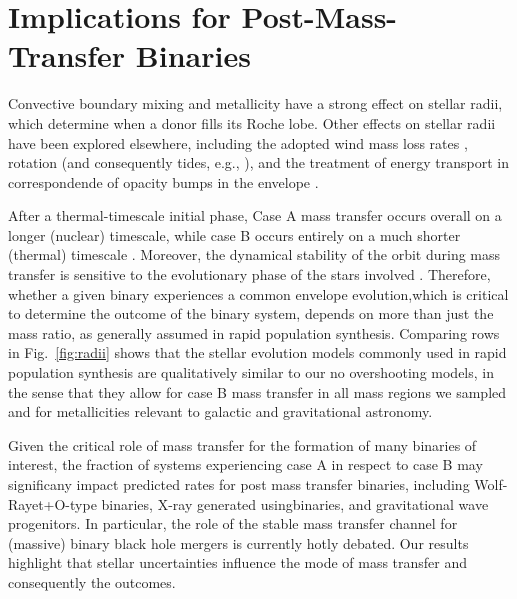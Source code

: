 \documentclass[twocolumn]{aastex631}
\DeclareRobustCommand{\Figref}[1]{Fig.~\ref{#1}}
\begin{document}
\section{Implications for Post-Mass-Transfer Binaries}

Convective boundary mixing \citep{brott:11, johnston:24} and
metallicity have a strong effect on stellar radii, which determine
when a donor fills its Roche lobe. Other effects on stellar radii have
been explored elsewhere, including the adopted wind mass loss rates
\citep[e.g.,][]{smith:14, renzo:17, josiek:24}, rotation (and
consequently tides, e.g., \citealt{maeder:00}), and the treatment of energy transport
in correspondende of opacity bumps in the envelope
\citep[e.g.,][]{joss:73, agrawal:22, cheng:24}.

After a thermal-timescale initial phase, Case A mass transfer occurs
overall on a longer (nuclear) timescale, while case B occurs entirely
on a much shorter (thermal) timescale \citep[but see][]{klencki:22}.
Moreover, the dynamical stability of the orbit during mass transfer is
sensitive to the evolutionary phase of the stars involved
\citep[e.g.,][]{claeys:14}. Therefore, whether a given binary
experiences a common envelope evolution,which is critical to determine
the outcome of the binary system, depends on more than just the mass
ratio, as generally assumed in rapid population synthesis. Comparing
rows in \Figref{fig:radii} shows that the stellar evolution models
commonly used in rapid population synthesis are qualitatively similar
to our no overshooting models, in the sense that they allow for case B
mass transfer in all mass regions we sampled and for metallicities
relevant to galactic and gravitational astronomy.

Given the critical role of mass transfer for the formation of many
binaries of interest, the fraction of systems experiencing case A in
respect to case B may significany impact predicted rates for post mass
transfer binaries, including Wolf-Rayet+O-type binaries, X-ray
generated usingbinaries, and gravitational wave progenitors. In
particular, the role of the stable mass transfer channel
\citep[e.g.,][]{marchant:21, vanson:22} for (massive) binary black
hole mergers is currently hotly debated. Our results highlight that
stellar uncertainties influence the mode of mass transfer and
consequently the outcomes.




\end{document}
